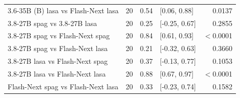 \begin{table}[t]
{\begin{tabular}{lrrlr}
3.6-35B (B) lasa vs Flash-Next lasa & 20 & 0.54 & [0.06, 0.88] & 0.0137 \\
3.8-27B spag vs 3.8-27B lasa & 20 & 0.25 & [-0.25, 0.67] & 0.2855 \\
3.8-27B spag vs Flash-Next spag & 20 & 0.84 & [0.61, 0.93] & $<$0.0001 \\
3.8-27B spag vs Flash-Next lasa & 20 & 0.21 & [-0.32, 0.63] & 0.3660 \\
3.8-27B lasa vs Flash-Next spag & 20 & 0.37 & [-0.13, 0.77] & 0.1053 \\
3.8-27B lasa vs Flash-Next lasa & 20 & 0.88 & [0.67, 0.97] & $<$0.0001 \\
Flash-Next spag vs Flash-Next lasa & 20 & 0.33 & [-0.23, 0.74] & 0.1582 \\
\bottomrule
\end{tabular}}
\end{table}
